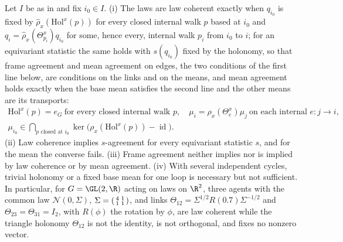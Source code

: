 Let $I$ be as in  and fix $i_0\in I$. (i) The laws are law coherent
exactly when $q_{i_0}$ is fixed by $\widehat\rho_x(\mathrm{Hol}^x(p))$ for every closed internal walk
$p$ based at $i_0$ and $q_i=\widehat\rho_x(\Theta^x_{p_i})q_{i_0}$ for some, hence every, internal walk
$p_i$ from $i_0$ to $i$; for an equivariant statistic the same holds with $s(q_{i_0})$ fixed by the
holonomy, so that frame agreement and mean agreement on edges, the two conditions of the first line
below, are conditions on the links and on the means, and mean agreement holds exactly when the base
mean satisfies the second line and the other means are its transports:
\begin{gather}
\mathrm{Hol}^x(p)=e_G\ \text{for every closed internal walk }p,
\quad
\mu_i=\rho_x(\Theta_e^x)\mu_j\ \text{on each internal }e:j\to i,
\label{eq:phil-two-agreements}\\
\mu_{i_0}\in\bigcap_{p\text{ closed at }i_0}\ker\bigl(\rho_x(\mathrm{Hol}^x(p))-\operatorname{id}\bigr).
\label{eq:phil-agreement-kernel}
\end{gather}
(ii) Law coherence implies $s$-agreement for every equivariant statistic $s$, and for the mean the converse fails. (iii) Frame agreement neither implies
nor is implied by law coherence or by mean agreement. (iv) With several independent cycles, trivial
holonomy or a fixed base mean for one loop is necessary but not sufficient. In particular, for
$G=\GL(2,\R)$ acting on laws on $\R^2$, three agents with the common law $\mathcal N(0,\Sigma)$,
$\Sigma=\begin{psmallmatrix}4&1\\1&1\end{psmallmatrix}$, and links
$\Theta_{12}=\Sigma^{1/2}R(0.7)\Sigma^{-1/2}$ and $\Theta_{23}=\Theta_{31}=I_2$, with $R(\phi)$ the
rotation by $\phi$, are law coherent while the triangle holonomy $\Theta_{12}$ is not the identity, is
not orthogonal, and fixes no nonzero vector. 

